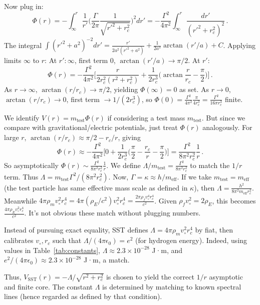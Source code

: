 \documentclass[reprint,aps,onecolumn,nofootinbib]{revtex4-2}
\begin{document}
	Now plug in:
	\[
		\Phi(r) = -\int_{\infty}^{r} \frac{1}{r'}\Big(\frac{\Gamma}{2\pi}\frac{1}{\sqrt{r'^2+r_c^2}}\Big)^2 dr' = -\frac{\Gamma^2}{4\pi^2}\int_{\infty}^{r} \frac{dr'}{(r'^2+r_c^2)^2}\,.
	\]
	The integral $\int (r'^2+a^2)^{-2}dr' = \frac{r'}{2a^2(r'^2+a^2)} + \frac{1}{2a^3}\arctan(r'/a) + C$. Applying limits $\infty$ to $r$:
	At $r':\infty$, first term $0$, $\arctan(r'/a)\to\pi/2$. At $r'$:
	\[
		\Phi(r) = -\frac{\Gamma^2}{4\pi^2}\Big[\frac{r}{2r_c^2(r^2+r_c^2)} + \frac{1}{2r_c^3}\Big(\arctan\frac{r}{r_c} - \frac{\pi}{2}\Big)\Big]\,.
	\]
	As $r\to\infty$, $\arctan(r/r_c)\to\pi/2$, yielding $\Phi(\infty)=0$ as set. As $r\to0$, $\arctan(r/r_c)\to0$, first term $\to 1/(2r_c^3)$, so $\Phi(0) = \frac{\Gamma^2}{4\pi^2}\frac{\pi}{4r_c^3} = \frac{\Gamma^2}{16\pi r_c^3}$ finite.

	We identify $V(r) = m_{\text{test}}\Phi(r)$ if considering a test mass $m_{\text{test}}$. But since we compare with gravitational/electric potentials, just treat $\Phi(r)$ analogously. For large $r$, $\arctan(r/r_c)\approx \pi/2 - r_c/r$, giving
	\[
		\Phi(r)\approx -\frac{\Gamma^2}{4\pi^2}\Big[0 + \frac{1}{2r_c^3}\Big(\frac{\pi}{2}-\frac{r_c}{r}-\frac{\pi}{2}\Big)\Big] = \frac{\Gamma^2}{8\pi^2 r_c^2}\frac{1}{r}\,.
	\]
	So asymptotically $\Phi(r)\sim \frac{\Gamma^2}{8\pi^2r_c^2}\frac{1}{r}$. We define $\Lambda/m_{\text{test}} = \frac{\Gamma^2}{8\pi^2r_c^2}$ to match the $1/r$ term. Thus $\Lambda = m_{\text{test}}\Gamma^2/(8\pi^2r_c^2)$. Now, $\Gamma = \kappa \approx h/m_{\text{eff}}$. If we take $m_{\text{test}}=m_{\text{eff}}$ (the test particle has same effective mass scale as defined in $\kappa$), then $\Lambda = \frac{h^2}{8\pi^2 m_{\text{eff}} r_c^2}$. Meanwhile $4\pi\rho_m v_{\circ}^2 r_c^4 = 4\pi(\rho_E/c^2) v_{\circ}^2 r_c^4 = \frac{2\pi \rho_f v_{\circ}^4 r_c^4}{c^2}$. Given $\rho_f v_{\circ}^2 = 2\rho_E$, this becomes $\frac{4\pi \rho_E v_{\circ}^2 r_c^4}{c^2}$. It’s not obvious these match without plugging numbers.

	Instead of pursuing exact equality, SST defines $\Lambda = 4\pi\rho_m v_{\circ}^2 r_c^4$ by fiat, then calibrates $v_{\circ}, r_c$ such that $\Lambda/(4\pi\epsilon_0) = e^2$ (for hydrogen energy). Indeed, using values in Table~\ref{tab:constants}, $\Lambda \approx 2.3\times 10^{-28}$ J·m, and $e^2/(4\pi\epsilon_0)\approx 2.3\times10^{-28}$ J·m, a match.

	Thus, $V_{\text{SST}}(r) = -\Lambda/\sqrt{r^2+r_c^2}$ is chosen to yield the correct $1/r$ asymptotic and finite core. The constant $\Lambda$ is determined by matching to known spectral lines (hence regarded as defined by that condition).
\end{document}
